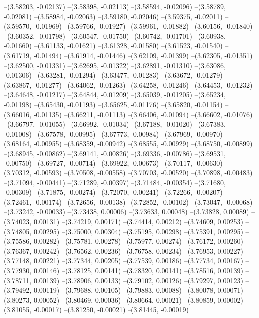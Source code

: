 --(3.58203, -0.02137)
--(3.58398, -0.02113)
--(3.58594, -0.02096)
--(3.58789, -0.02081)
--(3.58984, -0.02063)
--(3.59180, -0.02046)
--(3.59375, -0.02011)
--(3.59570, -0.01969)
--(3.59766, -0.01927)
--(3.59961, -0.01882)
--(3.60156, -0.01840)
--(3.60352, -0.01798)
--(3.60547, -0.01750)
--(3.60742, -0.01701)
--(3.60938, -0.01660)
--(3.61133, -0.01621)
--(3.61328, -0.01580)
--(3.61523, -0.01540)
--(3.61719, -0.01494)
--(3.61914, -0.01446)
--(3.62109, -0.01399)
--(3.62305, -0.01351)
--(3.62500, -0.01331)
--(3.62695, -0.01322)
--(3.62891, -0.01310)
--(3.63086, -0.01306)
--(3.63281, -0.01294)
--(3.63477, -0.01283)
--(3.63672, -0.01279)
--(3.63867, -0.01277)
--(3.64062, -0.01263)
--(3.64258, -0.01246)
--(3.64453, -0.01232)
--(3.64648, -0.01217)
--(3.64844, -0.01209)
--(3.65039, -0.01205)
--(3.65234, -0.01198)
--(3.65430, -0.01193)
--(3.65625, -0.01176)
--(3.65820, -0.01154)
--(3.66016, -0.01135)
--(3.66211, -0.01113)
--(3.66406, -0.01094)
--(3.66602, -0.01076)
--(3.66797, -0.01055)
--(3.66992, -0.01034)
--(3.67188, -0.01020)
--(3.67383, -0.01008)
--(3.67578, -0.00995)
--(3.67773, -0.00984)
--(3.67969, -0.00970)
--(3.68164, -0.00955)
--(3.68359, -0.00942)
--(3.68555, -0.00929)
--(3.68750, -0.00899)
--(3.68945, -0.00862)
--(3.69141, -0.00826)
--(3.69336, -0.00786)
--(3.69531, -0.00750)
--(3.69727, -0.00714)
--(3.69922, -0.00673)
--(3.70117, -0.00630)
--(3.70312, -0.00593)
--(3.70508, -0.00558)
--(3.70703, -0.00520)
--(3.70898, -0.00483)
--(3.71094, -0.00441)
--(3.71289, -0.00397)
--(3.71484, -0.00354)
--(3.71680, -0.00309)
--(3.71875, -0.00274)
--(3.72070, -0.00241)
--(3.72266, -0.00207)
--(3.72461, -0.00174)
--(3.72656, -0.00138)
--(3.72852, -0.00102)
--(3.73047, -0.00068)
--(3.73242, -0.00033)
--(3.73438, 0.00006)
--(3.73633, 0.00048)
--(3.73828, 0.00089)
--(3.74023, 0.00131)
--(3.74219, 0.00171)
--(3.74414, 0.00212)
--(3.74609, 0.00253)
--(3.74805, 0.00295)
--(3.75000, 0.00304)
--(3.75195, 0.00298)
--(3.75391, 0.00295)
--(3.75586, 0.00282)
--(3.75781, 0.00278)
--(3.75977, 0.00274)
--(3.76172, 0.00260)
--(3.76367, 0.00242)
--(3.76562, 0.00236)
--(3.76758, 0.00234)
--(3.76953, 0.00227)
--(3.77148, 0.00221)
--(3.77344, 0.00205)
--(3.77539, 0.00186)
--(3.77734, 0.00167)
--(3.77930, 0.00146)
--(3.78125, 0.00141)
--(3.78320, 0.00141)
--(3.78516, 0.00139)
--(3.78711, 0.00139)
--(3.78906, 0.00133)
--(3.79102, 0.00126)
--(3.79297, 0.00123)
--(3.79492, 0.00119)
--(3.79688, 0.00105)
--(3.79883, 0.00088)
--(3.80078, 0.00071)
--(3.80273, 0.00052)
--(3.80469, 0.00036)
--(3.80664, 0.00021)
--(3.80859, 0.00002)
--(3.81055, -0.00017)
--(3.81250, -0.00021)
--(3.81445, -0.00019)
